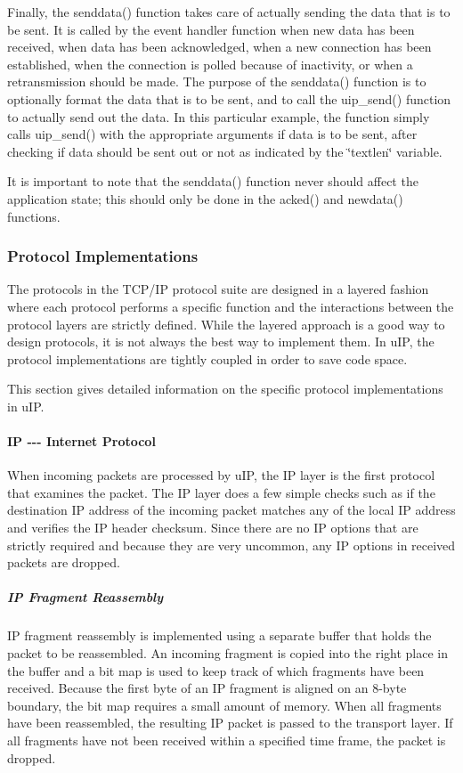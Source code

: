 \-Finally, the senddata() function takes care of actually sending the data that is to be sent. \-It is called by the event handler function when new data has been received, when data has been acknowledged, when a new connection has been established, when the connection is polled because of inactivity, or when a retransmission should be made. \-The purpose of the senddata() function is to optionally format the data that is to be sent, and to call the uip\-\_\-send() function to actually send out the data. \-In this particular example, the function simply calls uip\-\_\-send() with the appropriate arguments if data is to be sent, after checking if data should be sent out or not as indicated by the \char`\"{}textlen\char`\"{} variable.

\-It is important to note that the senddata() function never should affect the application state; this should only be done in the acked() and newdata() functions.\hypertarget{a00060_protoimpl}{}\subsubsection{\-Protocol Implementations}\label{a00060_protoimpl}
\-The protocols in the \-T\-C\-P/\-I\-P protocol suite are designed in a layered fashion where each protocol performs a specific function and the interactions between the protocol layers are strictly defined. \-While the layered approach is a good way to design protocols, it is not always the best way to implement them. \-In u\-I\-P, the protocol implementations are tightly coupled in order to save code space.

\-This section gives detailed information on the specific protocol implementations in u\-I\-P.\hypertarget{a00060_ip}{}\paragraph{\-I\-P -\/-\/-\/ Internet Protocol}\label{a00060_ip}
\-When incoming packets are processed by u\-I\-P, the \-I\-P layer is the first protocol that examines the packet. \-The \-I\-P layer does a few simple checks such as if the destination \-I\-P address of the incoming packet matches any of the local \-I\-P address and verifies the \-I\-P header checksum. \-Since there are no \-I\-P options that are strictly required and because they are very uncommon, any \-I\-P options in received packets are dropped.\hypertarget{a00060_ipreass}{}\subparagraph{\-I\-P Fragment Reassembly}\label{a00060_ipreass}
\-I\-P fragment reassembly is implemented using a separate buffer that holds the packet to be reassembled. \-An incoming fragment is copied into the right place in the buffer and a bit map is used to keep track of which fragments have been received. \-Because the first byte of an \-I\-P fragment is aligned on an 8-\/byte boundary, the bit map requires a small amount of memory. \-When all fragments have been reassembled, the resulting \-I\-P packet is passed to the transport layer. \-If all fragments have not been received within a specified time frame, the packet is dropped.


